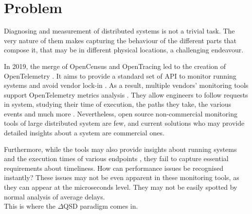 \section{Problem}
    Diagnosing and measurement of distributed systems is not a trivial task. The very nature of them makes capturing the behaviour of the different parts that compose it, that may be in different physical locations, a challenging endeavour. \cite{dist-m}

    In 2019, the merge of OpenCensus and OpenTracing led to the creation of OpenTelemetry \cite{openc}. It aims to provide a standard set of API to monitor running systems and avoid vendor lock-in \cite{otel-v}. As a result, multiple vendors' monitoring tools support OpenTelemetry metrics analysis \cite{otel-ven}. They allow engineers to follow requests in system, studying their time of execution, the paths they take, the various events and much more \cite{otel-t}. Nevertheless, open source non-commercial monitoring tools of large distributed system are few, and current solutions who may provide detailed insights about a system are commercial ones. \cite{otel-aw} 

    Furthermore, while the tools may also provide insights about running systems and the execution times of various endpoints \cite{jag-spm}, they fail to capture essential requirements about timeliness. How can performance issues be recognised instantly? These issues may not be even apparent in these monitoring tools, as they can appear at the microseconds level. They may not be easily spotted by normal analysis of average delays. \\
    This is where the $\Delta$QSD paradigm comes in.



